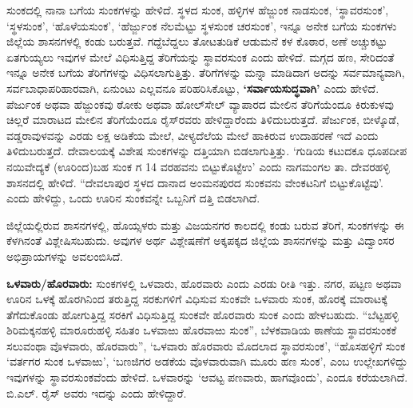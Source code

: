 ಸುಂಕದಲ್ಲಿ ನಾನಾ ಬಗೆಯ ಸುಂಕಗಳನ್ನು ಹೇಳಿದೆ. ಸ್ಥಳದ ಸುಂಕ, ಹಳ್ಳಿಗಳ ಹೆಜ್ಜುಂಕ ನಾಡಸುಂಕ, ‘ಸ್ಥಾವರಸುಂಕ’, ‘ಸ್ಥಳಸುಂಕ’, ‘ಹೊಳೆಯಸುಂಕ’, ‘ಹೆರ್ಜ್ಜುಂಕ ನೆಲಮೆಟ್ಟು ಸ್ಥಳಸುಂಕ ಚರಸುಂಕ’, ಇನ್ನೂ ಅನೇಕ ಬಗೆಯ ಸುಂಕಗಳು ಜಿಲ್ಲೆಯ ಶಾಸನಗಳಲ್ಲಿ ಕಂಡು ಬರುತ್ತವೆ. ಗದ್ದೆಬೆದ್ದಲು ತೋಟತುಡಿಕೆ ಆಡುಮನೆ ಕಳ ಕೊಠಾರ, ಅಣೆ ಅಚ್ಚುಕಟ್ಟು ಏತಗುಯ್ಯಲು ಇವುಗಳ ಮೇಲೆ ವಿಧಿಸುತ್ತಿದ್ದ ತೆರಿಗೆಯನ್ನು ಸ್ಥಾವರಸುಂಕ ಎಂದು ಹೇಳಿದೆ. ಮಗ್ಗದ ಹಣ, ಸೇರಿದಂತೆ ಇನ್ನೂ ಅನೇಕ ಬಗೆಯ ತೆರಿಗೆಗಳನ್ನು ವಿಧಿಸಲಾಗುತ್ತಿತ್ತು. ತೆರಿಗೆಗಳನ್ನು ಮನ್ನಾ ಮಾಡಿದಾಗ ಅದನ್ನು ಸರ್ವಮಾನ್ಯವಾಗಿ, ಸರ್ವಬಾಧಾಪರಿಹಾರವಾಗಿ, ಏನುಂಟು ಎಲ್ಲವನೂ ಪರಿಹರಿಸಿಕೊಟ್ಟು, \textbf{‘ಸರ್ವಾಯಸುದ್ಧವಾಗಿ’} ಎಂದು ಹೇಳಿದೆ. ಪೆರ್ಜುಂಕ ಅಥವಾ ಹೆಜ್ಜುಂಕವು ಠೋಕು ಅಥವಾ ಹೋಲ್​ಸೇಲ್​ ವ್ಯಾಪಾರದ ಮೇಲಿನ ತೆರಿಗೆಯೆಂದೂ ಕಿರುಕುಳವು ಚಿಲ್ಲರೆ ಮಾರಾಟದ ಮೇಲಿನ ತೆರಿಗೆಯೆಂದೂ ರೈಸ್​ರವರು ಹೇಳಿದ್ದಾರೆಂದು ತಿಳಿದುಬರುತ್ತದೆ. ಪೆರ್ಜುಂಕ, ಬೀಳ್ಕೊಡೆ, ವಡ್ಡರಾವುಳವನ್ನು ಎರಡು ಲಕ್ಷ ಅಡಿಕೆಯ ಮೇಲೆ, ವೀಳ್ಯದೆಲೆಯ ಮೇಲೆ ಹಾಕಿರುವ ಉದಾಹರಣೆ ಇದೆ ಎಂದು ತಿಳಿದುಬರುತ್ತದೆ. ದೇವಾಲಯಕ್ಕೆ ವಿಶೇಷ ಸುಂಕಗಳನ್ನು ದತ್ತಿಯಾಗಿ ಬಿಡಲಾಗುತ್ತಿತ್ತು. ‘ಗುಡಿಯ ಕಟುದಕೂ ಧೂಪದೀಪ ನಯಿವೇದ್ಯಕೆ (ಊರಿಂದ)ಬಹ ಸುಂಕ ಗ 14 ವರಹವನು ಬಿಟ್ಟುಕೊಟ್ಟೆಉ’ ಎಂದು ನಾಗಮಂಗಲ ತಾ. ದೇವರಹಳ್ಳಿ ಶಾಸನದಲ್ಲಿ ಹೇಳಿದೆ. “ದೇವಲಾಪುರ ಸ್ಥಳದ ದಾನಾದ ಅಂಮನಪುರದ ಸುಂಕವನು ವೇಂಕಟನಿಗೆ ಬಿಟ್ಟುಕೊಟ್ಟೆವು’. ಎಂದು ಹೇಳಿದ್ದು, ಒಂದು ಊರಿನ ಸುಂಕವನ್ನೇ ಒಬ್ಬನಿಗೆ ದತ್ತಿ ಬಿಡಲಾಗಿದೆ.

ಜಿಲ್ಲೆಯಲ್ಲಿರುವ ಶಾಸನಗಳಲ್ಲಿ, ಹೊಯ್ಸಳರು ಮತ್ತು ವಿಜಯನಗರ ಕಾಲದಲ್ಲಿ ಕಂಡು ಬರುವ ತೆರಿಗೆ, ಸುಂಕಗಳನ್ನು ಈ ಕೆಳಗಿನಂತೆ ವಿಶ್ಲೇಷಿಸಬಹುದು. ಅವುಗಳ ಅರ್ಥ ವಿಶ್ಲೇಷಣೆಗೆ ಅಕ್ಕಪಕ್ಕದ ಜಿಲ್ಲೆಯ ಶಾಸನಗಳನ್ನು ಮತ್ತು ವಿದ್ವಾಂಸರ ಅಭಿಪ್ರಾಯಗಳನ್ನು ಅವಲಂಬಿಸಿದೆ.

\newpage

\textbf{ಒಳವಾರು/ಹೊರವಾರು: } ಸುಂಕಗಳಲ್ಲಿ ಒಳವಾರು, ಹೊರವಾರು ಎಂದು ಎರಡು ರೀತಿ ಇತ್ತು. ನಗರ, ಪಟ್ಟಣ ಅಥವಾ ಊರಿನ ಒಳಕ್ಕೆ ಹೊರಗಿನಿಂದ ತರುತ್ತಿದ್ದ ಸರಕುಗಳಿಗೆ ವಿಧಿಸುವ ಸುಂಕವೇ ಒಳವಾರು ಸುಂಕ, ಹೊರಕ್ಕೆ ಮಾರಾಟಕ್ಕೆ ತೆಗೆದುಕೊಂಡು ಹೋಗುತ್ತಿದ್ದ ಸರಕಿಗೆ ವಿಧಿಸುತ್ತಿದ್ದ ಸುಂಕವೇ ಹೊರವಾರು ಸುಂಕ ಎಂದು ಹೇಳಬಹುದು. “ಬೆಟ್ಟಹಳ್ಳಿ ಶಿರಿಮಕ್ಕನಹಳ್ಳಿ ಮಾರೂರುಹಳ್ಳಿ ಸಹಿತಂ ಒಳವಾಱು ಹೊರವಾಱು ಸುಂಕ”, ಬೆಳಕವಾಡಿಯ ಠಾಣೆಯ ಸ್ಥಾವರಸುಂಕಕೆ ಸಲುವಂಥಾ ವೊಳವಾರು, ಹೊರವಾರು”, ‘ಒಳವಾರು ಹೊರವಾರು ಮೊದಲಾದ ಸ್ಥಾವರಸುಂಕ’, “ಹೊಸಹಳ್ಳಿಗೆ ಸುಂಕ ‘ವರ್ತಗರ ಸುಂಕ ಒಳವಾಱು’, ‘ಬಣಜಿಗರ ಅಡಕೆಯ ವೊಳವಾರುವಾಗಿ ಮೂರು ಹಣ ಸುಂಕ’, ಎಂಬ ಉಲ್ಲೇಖಗಳಿದ್ದು ಇವುಗಳನ್ನು ಸ್ಥಾವರಸುಂಕವೆಂದು ಹೇಳಿದೆ. ಒಳವಾರನ್ನು ‘ಆವಟ್ಟ ಪಣವಾರು, ಹಾಗವೊಂದು’, ಎಂದೂ ಕರೆಯಲಾಗಿದೆ. ಬಿ.ಎಲ್​. ರೈಸ್​ ಅವರು ಇದನ್ನು  ಎಂದು ಹೇಳಿದ್ದಾರೆ.

